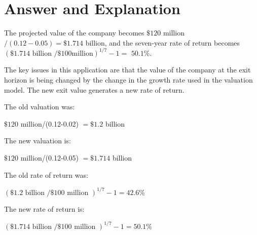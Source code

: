 \documentclass[11pt]{article}
\begin{document}
\section*{Answer and Explanation}
The projected value of the company becomes $\$ 120$ million $/(0.12-0.05)=\$ 1.714$ billion, and the seven-year rate of return becomes $(\$ 1.714 \text { billion } / \$ 100 \mathrm{million})^{1 / 7}-1=$ $50.1 \%$.

The key issues in this application are that the value of the company at the exit horizon is being changed by the change in the growth rate used in the valuation model. The new exit value generates a new rate of return.

The old valuation was:

$\$ 120$ million/(0.12-0.02) $=\$ 1.2$ billion

The new valuation is:

$\$ 120$ million/(0.12-0.05) $=\$ 1.714$ billion

The old rate of return was:

$(\$ 1.2 \text { billion } / \$ 100 \text { million })^{1 / 7}-1=42.6 \%$

The new rate of return is:

$(\$ 1.714 \text { billion } / \$ 100 \text { million })^{1 / 7}-1=50.1 \%$
\end{document}
